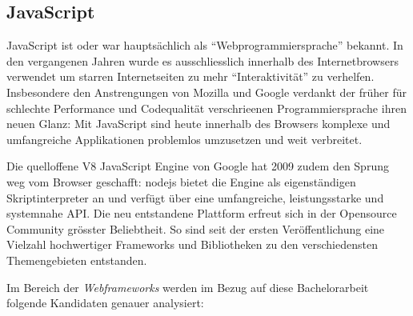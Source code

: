\subsection{JavaScript}
\label{sec:technology-evaluation-javascript}

JavaScript ist oder war hauptsächlich als ``Webprogrammiersprache'' bekannt. In den vergangenen Jahren wurde es ausschliesslich innerhalb des Internetbrowsers verwendet um starren Internetseiten zu mehr ``Interaktivität'' zu verhelfen. Insbesondere den Anstrengungen von Mozilla \cite{SpiderMonkey} und Google \cite{V8JavaScript} verdankt der früher für schlechte Performance und Codequalität verschrieenen Programmiersprache ihren neuen Glanz: Mit JavaScript sind heute innerhalb des Browsers komplexe und umfangreiche Applikationen problemlos umzusetzen und weit verbreitet.

Die quelloffene V8 JavaScript Engine \cite{V8JavaScript} von Google hat 2009 zudem den Sprung weg vom Browser geschafft: \gls{nodejs} \cite{nodejs} bietet die Engine als eigenständigen Skriptinterpreter an und verfügt über eine umfangreiche, leistungsstarke und systemnahe API. Die neu entstandene Plattform erfreut sich in der Opensource Community grösster Beliebtheit. So sind seit der ersten Veröffentlichung eine Vielzahl hochwertiger Frameworks und Bibliotheken zu den verschiedensten Themengebieten entstanden.

Im Bereich der \emph{Webframeworks} werden im Bezug auf diese Bachelorarbeit folgende Kandidaten genauer analysiert:

